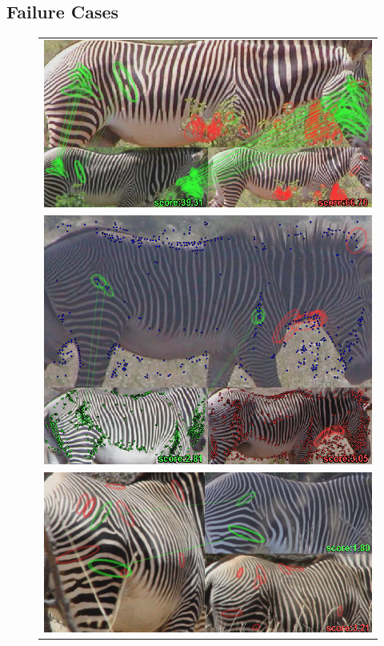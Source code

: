 \subsection{Failure Cases}

\begin{figure}
\begin{center}
\begin{tabular}{c}
\includegraphics[width=.9\linewidth]{figures/FinalImages/cropped/GZ_incorrectRank4_443_cropped_fix}
\\
\includegraphics[width=.9\linewidth]{figures/FinalImages/cropped/GZ_incorrectRank2_501_cropped}
\\
\includegraphics[width=.9\linewidth]{figures/FinalImages/cropped/GZ_incorrectRank6_1048_cropped_2}%

\end{tabular}
\end{center}
\end{figure}
